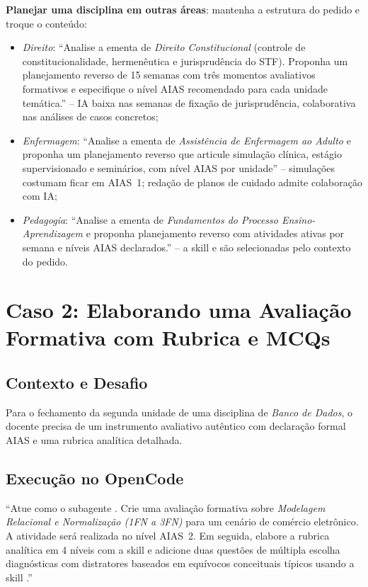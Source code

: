 \begin{adaptacaoarea}
\textbf{Planejar uma disciplina em outras {\'a}reas}: mantenha a estrutura do pedido e troque o conte{\'u}do:
\begin{itemize}
  \item \emph{Direito}: ``Analise a ementa de \emph{Direito Constitucional} (controle de constitucionalidade, hermen{\^e}utica e jurisprud{\^e}ncia do STF). Proponha um planejamento reverso de 15 semanas com tr{\^e}s momentos avaliativos formativos e especifique o n{\'i}vel AIAS recomendado para cada unidade tem{\'a}tica.'' -- IA baixa nas semanas de fixa{\c c}{\~a}o de jurisprud{\^e}ncia, colaborativa nas an{\'a}lises de casos concretos;
  \item \emph{Enfermagem}: ``Analise a ementa de \emph{Assist{\^e}ncia de Enfermagem ao Adulto} e proponha um planejamento reverso que articule simula{\c c}{\~a}o cl{\'i}nica, est{\'a}gio supervisionado e semin{\'a}rios, com n{\'i}vel AIAS por unidade'' -- simula{\c c}{\~o}es costumam ficar em AIAS~1; reda{\c c}{\~a}o de planos de cuidado admite colabora{\c c}{\~a}o com IA;
  \item \emph{Pedagogia}: ``Analise a ementa de \emph{Fundamentos do Processo Ensino-Aprendizagem} e proponha planejamento reverso com atividades ativas por semana e n{\'i}veis AIAS declarados.'' -- a skill  e  s{\~a}o selecionadas pelo contexto do pedido.
\end{itemize}
\end{adaptacaoarea}

\section{Caso 2: Elaborando uma Avalia{\c c}{\~a}o Formativa com Rubrica e MCQs}

\subsection{Contexto e Desafio}
Para o fechamento da segunda unidade de uma disciplina de \emph{Banco de Dados}, o docente precisa de um instrumento avaliativo aut{\^e}ntico com declara{\c c}{\~a}o formal AIAS e uma rubrica anal{\'i}tica detalhada.

\subsection{Execu{\c c}{\~a}o no OpenCode}
\begin{tcolorbox}[colback=white, colframe=boxborder, arc=1mm, title={Comando Enviado pelo Professor}]
\small
``Atue como o subagente . Crie uma avalia{\c c}{\~a}o formativa sobre \emph{Modelagem Relacional e Normaliza{\c c}{\~a}o (1FN a 3FN)} para um cen{\'a}rio de com{\'e}rcio eletr{\^o}nico. A atividade ser{\'a} realizada no n{\'i}vel AIAS~2. Em seguida, elabore a rubrica anal{\'i}tica em 4 n{\'i}veis com a skill  e adicione duas quest{\~o}es de m{\'u}ltipla escolha diagn{\'o}sticas com distratores baseados em equ{\'i}vocos conceituais t{\'i}picos usando a skill .''
\end{tcolorbox}

